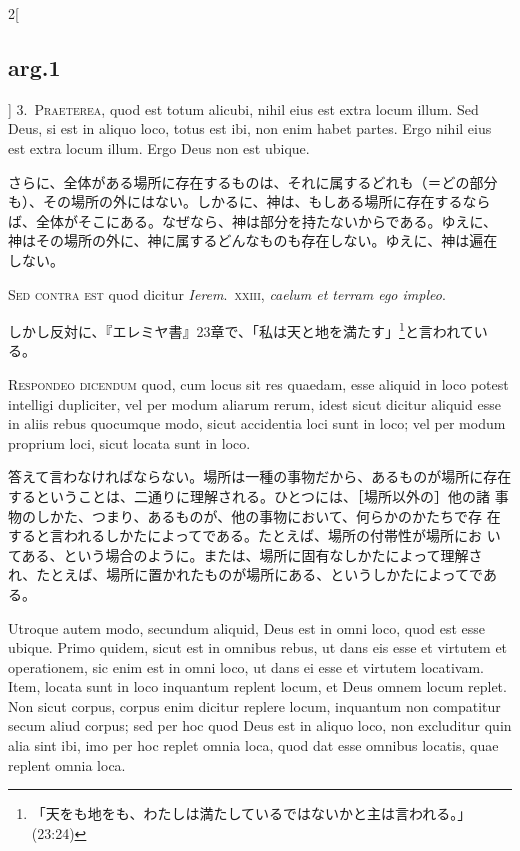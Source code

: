 \documentclass[paper=a4paper,fontsize=10pt,jafontsize=9pt,titlepage]{jlreq}
\begin{document}
\begin{paracol}{2}[\subsection{arg.1}]
3.~{\scshape Praeterea}, quod est totum alicubi, nihil eius est extra locum
 illum. Sed Deus, si est in aliquo loco, totus est ibi, non enim habet
 partes. Ergo nihil eius est extra locum illum. Ergo Deus non est
 ubique.

\switchcolumn

さらに、全体がある場所に存在するものは、それに属するどれも（＝どの部分
 も）、その場所の外にはない。しかるに、神は、もしある場所に存在するなら
 ば、全体がそこにある。なぜなら、神は部分を持たないからである。ゆえに、
 神はその場所の外に、神に属するどんなものも存在しない。ゆえに、神は遍在
 しない。

\switchcolumn*[\subsection{s.c.}]

{\scshape Sed contra est} quod dicitur {\itshape Ierem}.~{\scshape xxiii}, {\itshape caelum et terram ego impleo}.

\switchcolumn

しかし反対に、『エレミヤ書』23章で、「私は天と地を満たす」\footnote{「天をも地をも、わたしは満たしているではないかと主は言われる。」(23:24)}と言われている。


{\scshape Respondeo dicendum} quod, cum locus sit res quaedam, esse aliquid in loco
 potest intelligi dupliciter, vel per modum aliarum rerum, idest sicut
 dicitur aliquid esse in aliis rebus quocumque modo, sicut accidentia
 loci sunt in loco; vel per modum proprium loci, sicut locata sunt in
 loco.

\switchcolumn

答えて言わなければならない。場所は一種の事物だから、あるものが場所に存在
 するということは、二通りに理解される。ひとつには、［場所以外の］他の諸
 事物のしかた、つまり、あるものが、他の事物において、何らかのかたちで存
 在すると言われるしかたによってである。たとえば、場所の付帯性が場所にお
 いてある、という場合のように。または、場所に固有なしかたによって理解さ
 れ、たとえば、場所に置かれたものが場所にある、というしかたによってであ
 る。

\switchcolumn*

Utroque autem modo, secundum aliquid, Deus est in omni loco,
 quod est esse ubique. Primo quidem, sicut est in omnibus rebus, ut dans
 eis esse et virtutem et operationem, sic enim est in omni loco, ut dans
 ei esse et virtutem locativam. Item, locata sunt in loco inquantum
 replent locum, et Deus omnem locum replet. Non sicut corpus, corpus
 enim dicitur replere locum, inquantum non compatitur secum aliud
 corpus; sed per hoc quod Deus est in aliquo loco, non excluditur quin
 alia sint ibi, imo per hoc replet omnia loca, quod dat esse omnibus
 locatis, quae replent omnia loca.


\end{paracol}
\end{document}
